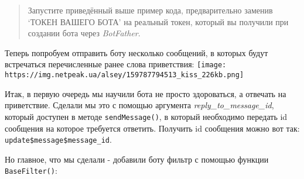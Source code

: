 \documentclass[
]{book}
\newenvironment{Shaded}{\begin{snugshade}}{\end{snugshade}}
\newcommand{\AttributeTok}[1]{\textcolor[rgb]{0.77,0.63,0.00}{#1}}
\newcommand{\CommentTok}[1]{\textcolor[rgb]{0.56,0.35,0.01}{\textit{#1}}}
\newcommand{\ConstantTok}[1]{\textcolor[rgb]{0.00,0.00,0.00}{#1}}
\newcommand{\ControlFlowTok}[1]{\textcolor[rgb]{0.13,0.29,0.53}{\textbf{#1}}}
\newcommand{\FunctionTok}[1]{\textcolor[rgb]{0.00,0.00,0.00}{#1}}
\newcommand{\NormalTok}[1]{#1}
\newcommand{\OtherTok}[1]{\textcolor[rgb]{0.56,0.35,0.01}{#1}}
\newcommand{\SpecialCharTok}[1]{\textcolor[rgb]{0.00,0.00,0.00}{#1}}
\newcommand{\StringTok}[1]{\textcolor[rgb]{0.31,0.60,0.02}{#1}}
\begin{document}
\begin{Shaded}
\end{Shaded}

\begin{quote}
Запустите приведённый выше пример кода, предварительно заменив `ТОКЕН ВАШЕГО БОТА' на реальный токен, который вы получили при создании бота через \emph{BotFather}.
\end{quote}

Теперь попробуем отправить боту несколько сообщений, в которых будут встречаться перечисленные ранее слова приветствия:
\texttt{[image: https://img.netpeak.ua/alsey/159787794513\_kiss\_226kb.png]}

Итак, в первую очередь мы научили бота не просто здороваться, а отвечать на приветствие. Сделали мы это с помощью аргумента \emph{reply\_to\_message\_id}, который доступен в методе \texttt{sendMessage()}, в который необходимо передать id сообщения на которое требуется ответить. Получить id сообщения можно вот так: \texttt{update\$message\$message\_id}.

Но главное, что мы сделали - добавили боту фильтр с помощью функции \texttt{BaseFilter()}:

\begin{Shaded}
\end{Shaded}
\end{document}
